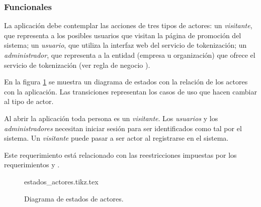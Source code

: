 %
%

\subsubsection{Funcionales}



{
  La aplicación debe contemplar las acciones de tres tipos de actores: un
  \textit{visitante}, que representa a los posibles usuarios que visitan la
  página de promoción del sistema; un \textit{usuario}, que utiliza la interfaz
  web del servicio de tokenización; un \textit{administrador}, que representa a
  la entidad (empresa u organización) que ofrece el servicio de tokenización
  (ver regla de negocio ).

  {
    En la figura \ref{estados_actores} se muestra un diagrama de estados con
    la relación de los actores con la aplicación. Las transiciones representan
    los casos de uso que hacen cambiar al tipo de actor.

    Al abrir la aplicación toda persona es un \textit{visitante}. Los
    \textit{usuarios} y los \textit{administradores} necesitan iniciar sesión
    para ser identificados como tal por el sistema. Un \textit{visitante} puede
    pasar a ser actor al registrarse en el sistema.

    Este requerimiento está relacionado con las reestricciones impuestas por los
    requerimientos  y
    .
  }
}

\begin{figure}
  \begin{center}
    {estados_actores.tikz.tex}
    \caption{Diagrama de estados de actores.}
    \label{estados_actores}
  \end{center}
\end{figure}

